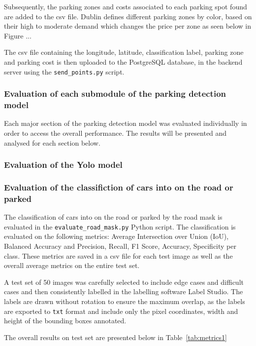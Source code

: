 Subsequently, the parking zones and costs associated to each parking spot found are added to the csv file.
Dublin defines different parking zones by color, based on their high to moderate demand which changes the price per zone as seen below in Figure ...

The csv file containing the longitude, latitude, classification label, parking zone and parking cost is then uploaded to the PostgreSQL database, in the backend server using the \texttt{send\_points.py} script.

\subsubsection{Evaluation of each submodule of the parking detection model}
Each major section of the parking detection model was evaluated individually in order to access the overall performance. The results will be presented and analysed for each section below.

\subsubsection{Evaluation of the Yolo model}

\subsubsection{Evaluation of the classifiction of cars into on the road or parked}
The classification of cars into on the road or parked by the road mask is evaluated in the \texttt{evaluate\_road\_mask.py} Python script.
The classification is evaluated on the following metrics: Average Intersection over Union (IoU), Balanced Accuracy and Precision, Recall, F1 Score, Accuracy, Specificity per class. These metrics are saved in a csv file for each test image as well as the overall average metrics on the entire test set.

A test set of 50 images was carefully selected to include edge cases and difficult cases and then consistently labelled in the labelling software Label Studio. The labels are drawn without rotation to ensure the maximum overlap, as the labels are exported to \texttt{txt} format and include only the pixel coordinates, width and  height of the bounding boxes annotated.

The overall results on test set are presented below in Table~\ref{tab:metrics1}

